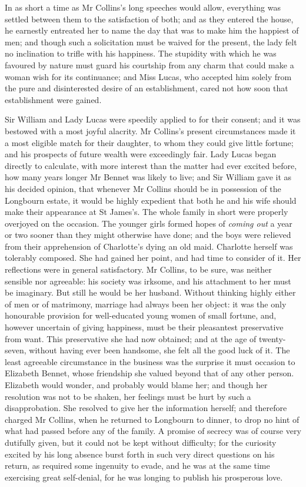 In as short a time as Mr Collins's long speeches would allow, everything was settled between them to the satisfaction of both; and as they entered the house, he earnestly entreated her to name the day that was to make him the happiest of men; and though such a solicitation must be waived for the present, the lady felt no inclination to trifle with his happiness. The stupidity with which he was favoured by nature must guard his courtship from any charm that could make a woman wish for its continuance; and Miss Lucas, who accepted him solely from the pure and disinterested desire of an establishment, cared not how soon that establishment were gained.

Sir William and Lady Lucas were speedily applied to for their consent; and it was bestowed with a most joyful alacrity. Mr Collins's present circumstances made it a most eligible match for their daughter, to whom they could give little fortune; and his prospects of future wealth were exceedingly fair. Lady Lucas began directly to calculate, with more interest than the matter had ever excited before, how many years longer Mr Bennet was likely to live; and Sir William gave it as his decided opinion, that whenever Mr Collins should be in possession of the Longbourn estate, it would be highly expedient that both he and his wife should make their appearance at St James's. The whole family in short were properly overjoyed on the occasion. The younger girls formed hopes of \textit{coming out} a year or two sooner than they might otherwise have done; and the boys were relieved from their apprehension of Charlotte's dying an old maid. Charlotte herself was tolerably composed. She had gained her point, and had time to consider of it. Her reflections were in general satisfactory. Mr Collins, to be sure, was neither sensible nor agreeable: his society was irksome, and his attachment to her must be imaginary. But still he would be her husband. Without thinking highly either of men or of matrimony, marriage had always been her object: it was the only honourable provision for well-educated young women of small fortune, and, however uncertain of giving happiness, must be their pleasantest preservative from want. This preservative she had now obtained; and at the age of twenty-seven, without having ever been handsome, she felt all the good luck of it. The least agreeable circumstance in the business was the surprise it must occasion to Elizabeth Bennet, whose friendship she valued beyond that of any other person. Elizabeth would wonder, and probably would blame her; and though her resolution was not to be shaken, her feelings must be hurt by such a disapprobation. She resolved to give her the information herself; and therefore charged Mr Collins, when he returned to Longbourn to dinner, to drop no hint of what had passed before any of the family. A promise of secrecy was of course very dutifully given, but it could not be kept without difficulty; for the curiosity excited by his long absence burst forth in such very direct questions on his return, as required some ingenuity to evade, and he was at the same time exercising great self-denial, for he was longing to publish his prosperous love.

